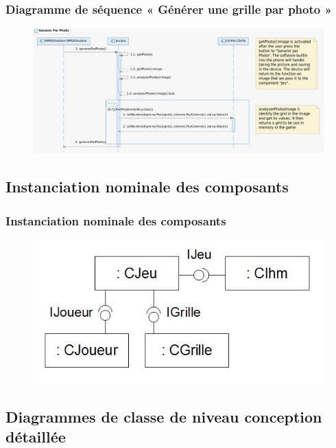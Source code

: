 \documentclass{beamer}
\begin{document}
\begin{frame}
  \frametitle{Diagramme de séquence « Générer une grille par photo »}
  \begin{figure}[h]
    \includegraphics[scale=0.275]{diagrammeSequence_03.png}
  \end{figure}
\end{frame}


\subsection{Instanciation nominale des composants}
\begin{frame}
\frametitle{Instanciation nominale des composants}
  \begin{figure}[h]
    \includegraphics[scale=0.6]{diagramme_instanciation_nominale.JPG}
  \end{figure}
\end{frame}

\subsection{Diagrammes de classe de niveau conception détaillée}
\end{document}
